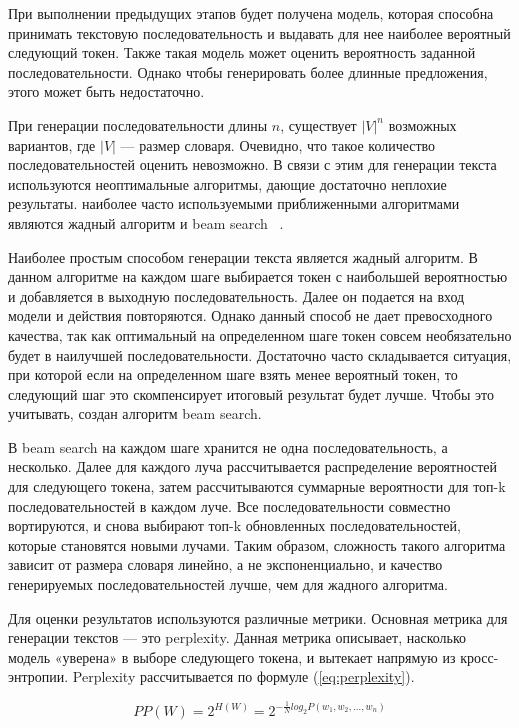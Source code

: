 При выполнении предыдущих этапов будет получена модель, которая способна принимать текстовую последовательность и выдавать для нее наиболее вероятный следующий токен. Также такая модель может оценить вероятность заданной последовательности. Однако чтобы генерировать более длинные предложения, этого может быть недостаточно.

При генерации последовательности длины $n$, существует $|V|^{n}$ возможных вариантов, где $|V|$ --- размер словаря. Очевидно, что такое количество последовательностей оценить невозможно. В связи с этим для генерации текста используются неоптимальные алгоритмы, дающие достаточно неплохие результаты. наиболее часто используемыми приближенными алгоритмами являются жадный алгоритм и beam search ~\cite{beam_search}.

Наиболее простым способом генерации текста является жадный алгоритм. В данном алгоритме на каждом шаге выбирается токен с наибольшей вероятностью и добавляется в выходную последовательность. Далее он подается на вход модели и действия повторяются. Однако данный способ не дает превосходного качества, так как оптимальный на определенном шаге токен совсем необязательно будет в наилучшей последовательности. Достаточно часто складывается ситуация, при которой если на определенном шаге взять менее вероятный токен, то следующий шаг это скомпенсирует итоговый результат будет лучше. Чтобы это учитывать, создан алгоритм beam search.

В beam search на каждом шаге хранится не одна последовательность, а несколько. Далее для каждого луча рассчитывается распределение вероятностей для следующего токена, затем рассчитываются суммарные вероятности для топ-k последовательностей в каждом луче. Все последовательности совместно вортируются, и снова выбирают топ-k обновленных последовательностей, которые становятся новыми лучами. Таким образом, сложность такого алгоритма зависит от размера словаря линейно, а не экспоненциально, и качество генерируемых последовательностей лучше, чем для жадного алгоритма.

Для оценки результатов используются различные метрики. Основная метрика для генерации текстов --- это perplexity. Данная метрика описывает, насколько модель «уверена» в выборе следующего токена, и вытекает напрямую из кросс-энтропии. Perplexity рассчитывается по формуле (\ref{eq:perplexity}). 

\begin{equation}
	PP(W) = 2^{H(W)} = 2^{-\frac{1}{N}log_2P(w_1, w_2,\dots,w_n)}
	\label{eq:perplexity}
\end{equation}

